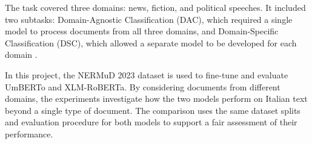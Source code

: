 The task covered three domains: news, fiction, and political speeches. It included two subtasks: Domain-Agnostic Classification (DAC), which required a single model to process documents from all three domains, and Domain-Specific Classification (DSC), which allowed a separate model to be developed for each domain \cite{palmeroaprosio2023nermud}.

In this project, the NERMuD 2023 dataset is used to fine-tune and evaluate UmBERTo and XLM-RoBERTa. By considering documents from different domains, the experiments investigate how the two models perform on Italian text beyond a single type of document. The comparison uses the same dataset splits and evaluation procedure for both models to support a fair assessment of their performance.